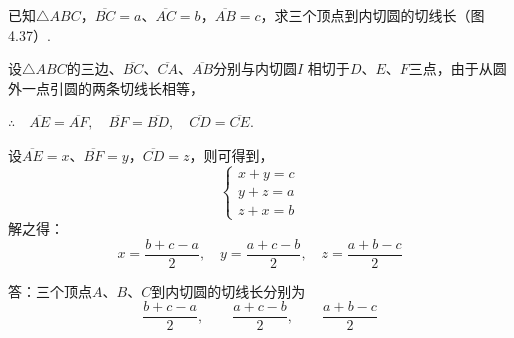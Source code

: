   \begin{example}
  已知$\triangle ABC$，$\overline{BC}=a$、$\overline{AC}=b$，$\overline{AB}=c$，求三个顶点到内切圆的切线长（图4.37）.
  \end{example}
  
  \begin{solution}
    设$\triangle ABC$的三边、$\overline{BC}$、$\overline{CA}$、$\overline{AB}$分别与内切圆$I$
  相切于$D$、$E$、$F$三点，由于从圆外一点引圆的两条切线长相等，
  
  $\therefore\quad \overline{AE}=\overline{AF},\quad \overline{BF}=\overline{BD},\quad \overline{CD}=\overline{CE}$. 
  
  设$\overline{AE}=x$、$\overline{BF}=y$，$\overline{CD}=z$，则可得到，
  \[\begin{cases}
    x+y=c\\
    y+z=a\\
    z+x=b
  \end{cases}\]
  解之得：
  \[x=\frac{b+c-a}{2},\quad y=\frac{a+c-b}{2},\quad z=\frac{a+b-c}{2}\]
  
  答：三个顶点$A$、$B$、$C$到内切圆的切线长分别为
  \[\frac{b+c-a}{2},\qquad \frac{a+c-b}{2},\qquad \frac{a+b-c}{2}\]
  \end{solution}
  
